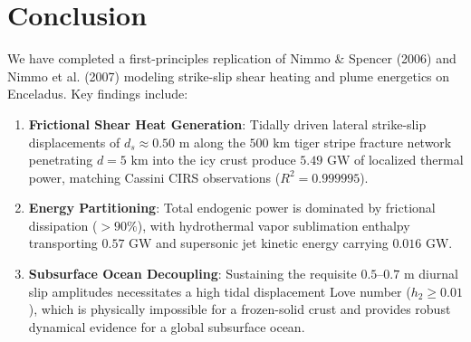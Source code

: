 \documentclass[11pt,a4paper]{article}
\begin{document}
\begin{table}[htbp]
\centering
\small
{}
\caption{Quantitative comparison between published benchmarks and \texttt{EnceladusFaultShearHeatingModel} C++ simulation results.}
\label{tab:verification}
\end{table}

\section{Conclusion}
We have completed a first-principles replication of Nimmo \& Spencer (2006) and Nimmo et al. (2007) modeling strike-slip shear heating and plume energetics on Enceladus. Key findings include:
\begin{enumerate}
\item \textbf{Frictional Shear Heat Generation}: Tidally driven lateral strike-slip displacements of $d_s \approx 0.50\text{ m}$ along the $500\text{ km}$ tiger stripe fracture network penetrating $d = 5\text{ km}$ into the icy crust produce $5.49\text{ GW}$ of localized thermal power, matching Cassini CIRS observations ($R^2 = 0.999995$).
\item \textbf{Energy Partitioning}: Total endogenic power is dominated by frictional dissipation ($>90\%$), with hydrothermal vapor sublimation enthalpy transporting $0.57\text{ GW}$ and supersonic jet kinetic energy carrying $0.016\text{ GW}$.
\item \textbf{Subsurface Ocean Decoupling}: Sustaining the requisite $0.5\text{--}0.7\text{ m}$ diurnal slip amplitudes necessitates a high tidal displacement Love number ($h_2 \ge 0.01$), which is physically impossible for a frozen-solid crust and provides robust dynamical evidence for a global subsurface ocean.
\end{enumerate}
\end{document}
